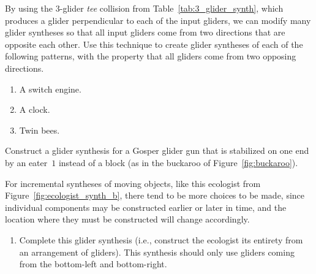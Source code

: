 \begin{multicols}{2}
\begin{problemstar}
\begin{enumerate}[label=\bf\color{ocre}(\alph*)]
	\end{enumerate}
\end{problemstar}


\mfilbreak


\begin{problemstar}\label{exer:glider_synth_tee}
	By using the $3$-glider \emph{tee} collision from Table~\ref{tab:3_glider_synth}, which produces a glider perpendicular to each of the input gliders, we can modify many glider syntheses so that all input gliders come from two directions that are opposite each other. Use this technique to create glider syntheses of each of the following patterns, with the property that all gliders come from two opposing directions.
	\begin{enumerate}[label=\bf\color{ocre}(\alph*)]
		\item A switch engine.
		
		\item A clock.
		
		\item Twin bees.
	\end{enumerate}
\end{problemstar}


\mfilbreak


\begin{problem}\label{exer:ggg_stabilized_by_eater_synthesis}
	Construct a glider synthesis for a Gosper glider gun that is stabilized on one end by an eater~$1$ instead of a block (as in the buckaroo of Figure~\ref{fig:buckaroo}).
\end{problem}


\mfilbreak


\begin{problem}\label{exer:ecologist_synth}
	For incremental syntheses of moving objects, like this ecologist from Figure~\ref{fig:ecologist_synth_b}, there tend to be more choices to be made, since individual components may be constructed earlier or later in time, and the location where they must be constructed will change accordingly.\smallskip
	
	\begin{enumerate}[label=\bf\color{ocre}(\alph*)]
		\item Complete this glider synthesis (i.e., construct the ecologist its entirety from an arrangement of gliders). This synthesis should only use gliders coming from the bottom-left and bottom-right.
		

\end{enumerate}
\end{problem}
\end{multicols}
